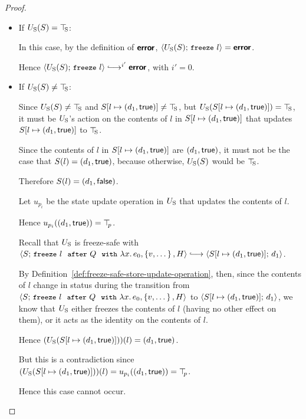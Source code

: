 \begin{proof}
\begin{itemize}
\begin{itemize}
    \item If $U_{\mathrm{S}}(S) = \top\hspace{-0.85mm}_{\mathrm{S}}$:

      In this case, by the definition of $\textbf{\textsf{error}}$,
      $\langle U_{\mathrm{S}}(S);\, \mbox{\small{\texttt{freeze}}}~l \rangle = \textbf{\textsf{error}}$.

      Hence $\config{\Ustore(S)}{\freeze{l}}
      \parstepsto^{i'} \error$, with $i' = 0$.

    \item If $U_{\mathrm{S}}(S) \neq \top\hspace{-0.85mm}_{\mathrm{S}}$:

      Since $U_{\mathrm{S}}(S) \neq \top\hspace{-0.85mm}_{\mathrm{S}}$ and $S[l \mapsto (d_1, \textsf{true})]
      \neq \top\hspace{-0.85mm}_{\mathrm{S}}$, but $U_{\mathrm{S}}(S[l \mapsto (d_1, \textsf{true})]) = \top\hspace{-0.85mm}_{\mathrm{S}}$,
      it must be $U_{\mathrm{S}}$'s action on the contents of $l$ in
      $S[l \mapsto (d_1, \textsf{true})]$ that updates
      $S[l \mapsto (d_1, \textsf{true})]$ to $\top\hspace{-0.85mm}_{\mathrm{S}}$.

      Since the contents of $l$ in $S[l \mapsto (d_1, \textsf{true})]$ are
      $(d_1, \textsf{true})$, it must not be the case that $S(l) =
      (d_1, \textsf{true})$, because otherwise, $U_{\mathrm{S}}(S)$ would be
      $\top\hspace{-0.85mm}_{\mathrm{S}}$.

      Therefore $S(l) = (d_1, \textsf{false})$.

      Let $u_{p_i}$ be the state update operation in $U_{\mathrm{S}}$ that
      updates the contents of $l$.

      Hence $u_{p_i}((d_1, \textsf{true})) = \top\hspace{-0.85mm}_{p}$.

      Recall that $U_{\mathrm{S}}$ is freeze-safe with
      $\config{S}{\freezeafterfull{l}{Q}{\lam{x}{e_0}}{\setof{v,
            \dots}}{H}} \parstepsto
      \config{\extS{S}{l}{d_1}{\frozentrue}}{d_1}$.

      By Definition~\ref{def:freeze-safe-store-update-operation},
      then, since the contents of $l$ change in status during the
      transition from
      $\langle S;\, \mbox{\small{\texttt{freeze}}}~l~~{\mbox{\small{\texttt{after}}}}~Q~~{\mbox{\small{\texttt{with}}}}~\lambda x.\,e_0, \left\{v,
            \dots\right\}, H \rangle$ to
      $\langle S[l \mapsto (d_1, \textsf{true})];\, d_1 \rangle$, we know that
      $U_{\mathrm{S}}$ either freezes the contents of $l$ (having no other effect
      on them), or it acts as the identity on the contents of $l$.

      Hence $(U_{\mathrm{S}}(S[l \mapsto (d_1, \textsf{true})]))(l) =
      (d_1, \textsf{true})$.

      But this is a contradiction since
      $(U_{\mathrm{S}}(S[l \mapsto (d_1, \textsf{true})]))(l) =
      u_{p_i}((d_1, \textsf{true})) = \top\hspace{-0.85mm}_{p}$.

      Hence this case cannot occur.
    \end{itemize}


\end{itemize}
\end{proof}
